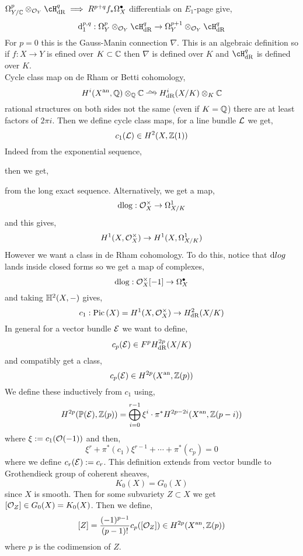 \documentclass[12pt]{article}
\begin{document}
$\Omega_{Y/\CC}^p \ot_{\struct{Y}} \cH_{\dR}^q \implies R^{p+q} f_* \Omega_{X}^\bullet$ 
differentials on $E_1$-page give,
\[ \d_1^{p,q} : \Omega^p_{Y} \ot_{\struct{Y}} \cH^q_{\dR} \to \Omega^{p+1}_Y \ot_{\struct{Y}} \cH^q_{\dR} \]
For $p = 0$ this is the Gauss-Manin connection $\nabla$. This is an algebraic definition so if $f : X \to Y$ is efined over $K \subset \mathbb{C}$ then $\nabla$ is defined over $K$ and $\cH^q_{\dR}$ is defined over $K$.
\bigskip\\
Cycle class map on de Rham or Betti cohomology,
\[ H^i(X^\an, \Q) \ot_\Q \CC \iso H^i_{\dR}(X/K) \ot_K \CC \]
rational structures on both sides not the same (even if $K = \mathbb{Q}$) there are at least factors of $2 \pi i$. Then we define cycle class maps, for a line bundle $\mathcal{L}$ we get,
\[ c_1(\mathcal{L}) \in H^2(X, \mathbb{Z}(1)) \]
Indeed from the exponential sequence,
\begin{center}
\end{center}
then we get,
\begin{center}
\end{center}
from the long exact sequence. Alternatively, we get a map,
\[ \mathrm{d}{\log} : \mathcal{O}_{X}^\times \to \Omega^1_{X/K} \]
and this gives,
\[ H^1(X, \mathcal{O}_{X}^\times) \to H^1(X, \Omega^1_{X/K}) \]
However we want a class in de Rham cohomology. To do this, notice that $\mathrm{d}{log}$ lands inside closed forms so we get a map of complexes,
\[ \mathrm{d}{\log} : \mathcal{O}_{X}^\times[-1] \to \Omega^\bullet_X \]
and taking $\mathbb{H}^2(X, -)$ gives,
\[ c_1 : \mathrm{Pic} \left( X \right) = H^1(X, \mathcal{O}_{X}^\times) \to H^2_{\mathrm{dR}}(X/K) \]
In general for a vector bundle $\mathcal{E}$ we want to define,
\[ c_p(\mathcal{E}) \in F^p H^{2p}_{\mathrm{dR}}(X/K) \]
and compatibly get a class,
\[ c_p(\mathcal{E}) \in H^{2p}(X^{\mathrm{an}}, \mathbb{Z}(p)) \]
We define these inductively from $c_1$ using,
\[ H^{2p}(\mathbb{P}(\mathcal{E}), \mathbb{Z}(p)) = \bigoplus_{i=0}^{r-1} \xi^i \cdot \pi^* H^{2p - 2i}(X^{\mathrm{an}}, \mathbb{Z}(p-i)) \]
where $\xi := c_1(\mathcal{O}_{}(-1))$ and then,
\[ \xi^r + \pi^*(c_1) \xi^{r-1} + \cdots + \pi^*(c_p) = 0 \]
where we define $c_r(\mathcal{E}) := c_r$. This definition extends from vector bundle to Grothendieck group of coherent sheaves,
\[ K_0(X) = G_0(X) \]
since $X$ is smooth. Then for some subvariety $Z \subset X$ we get $[\mathcal{O}_{Z}] \in G_0(X) = K_0(X)$. Then we define,
\[ [Z] = \frac{(-1)^{p-1}}{(p-1)!} c_p([\mathcal{O}_{Z}]) \in H^{2p}(X^{\mathrm{an}}, \mathbb{Z}(p)) \]
where $p$ is the codimension of $Z$.
\end{document}

